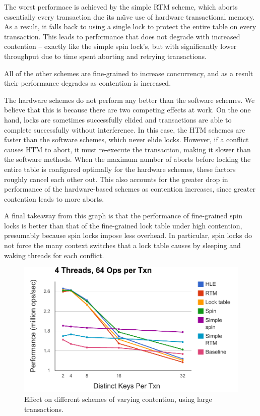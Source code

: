 The worst performace is achieved by the simple RTM scheme, which aborts
essentially every transaction due its na\"{\i}ve use of hardware transactional
memory.  As a result, it falls back to using a single lock to protect the entire
table on every transaction. This leads to performance that does not degrade with
increased contention -- exactly like the simple spin lock's, but with
significantly lower throughput due to time spent aborting and retrying
transactions.

All of the other schemes are fine-grained to increase concurrency, and as a
result their performance degrades as contention is increased.

The hardware schemes do not perform any better than the software schemes. We
believe that this is because there are two competing effects at work. On the one
hand, locks are sometimes successfully elided and transactions are able to
complete successfully without interference. In this case, the HTM schemes are
faster than the software schemes, which never elide locks.  However, if a
conflict causes HTM to abort, it must re-execute the transaction, making it
slower than the software methods. When the maximum number of aborts before
locking the entire table is configured optimally for the hardware schemes, these
factors roughly cancel each other out. This also accounts for the greater drop
in performance of the hardware-based schemes as contention increases, since
greater contention leads to more aborts.

A final takeaway from this graph is that the performance of fine-grained spin
locks is better than that of the fine-grained lock table under high contention,
presumably because spin locks impose less overhead. In particular, spin locks do
not force the many context switches that a lock table causes by sleeping and
waking threads for each conflict.

\begin{figure}[h!]
  \centering
  \includegraphics[scale=0.575]{figure/large_txns.pdf}
  \caption{Effect on different schemes of varying contention, using large
    transactions.}
  \label{fig:large_txns} 
\end{figure}


